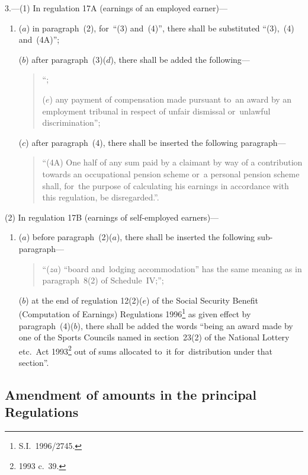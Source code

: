 \documentclass[12pt,a4paper]{article}
\begin{document}
3.---(1)  In regulation 17A (earnings of an employed earner)—
\begin{enumerate}\item[]
($a$) in paragraph~(2), for~“(3) and~(4)”, there shall be substituted “(3),~(4) and~(4A)”;

($b$) after paragraph~(3)($d$), there shall be added the following—
\begin{quotation}
“;

($e$) any payment of compensation made pursuant to~an award by an employment tribunal in respect of unfair dismissal or~unlawful discrimination”;
\end{quotation}

($c$) after paragraph~(4), there shall be inserted the following paragraph—
\begin{quotation}
“(4A) One half of any sum paid by a claimant by way of a contribution towards an occupational pension scheme or~a personal pension scheme shall, for~the purpose of calculating his earnings in accordance with this regulation, be disregarded.”.
\end{quotation}
\end{enumerate}

(2) In regulation 17B (earnings of self-employed earners)—
\begin{enumerate}\item[]
($a$) before paragraph~(2)($a$), there shall be inserted the following sub-paragraph—
\begin{quotation}
“($za$) “board and~lodging accommodation” has the same meaning as in paragraph~8(2) of Schedule~IV;”;
\end{quotation}

($b$) at the end of regulation 12(2)($e$)  of the Social Security Benefit (Computation of Earnings) Regulations 1996\footnote{S.I.~1996/2745.} as given effect by paragraph~(4)($b$), there shall be added the words “being an award made by one of the Sports Councils named in section~23(2) of the National Lottery etc.\ Act 1993\footnote{1993 c.~39.} out of sums allocated to~it for~distribution under that section”.
\end{enumerate}

\subsection[4. Amendment of amounts in the principal Regulations]{Amendment of amounts in the principal Regulations}
\end{document}
